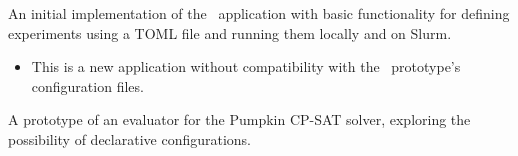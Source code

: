 
An initial implementation of the \gourdtest\ application
with basic functionality for defining experiments using a
TOML file and running them locally and on Slurm.

\breakingchanges
\begin{itemize}
\item This is a new application without compatibility with
the \gourdtest\ prototype's configuration files.
\end{itemize}


A prototype of an evaluator for the Pumpkin CP-SAT solver,
exploring the possibility of declarative configurations.

\clearpage
